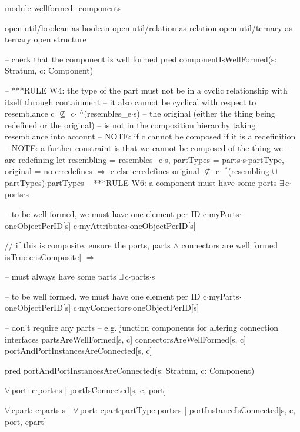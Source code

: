 module wellformed_components

open util/boolean as boolean
open util/relation as relation
open util/ternary as ternary
open structure


-- check that the component is well formed
pred componentIsWellFormed(s: Stratum, c: Component)
{
  -- ***RULE W4: the type of the part must not be in a cyclic relationship with itself through containment
  -- it also cannot be cyclical with respect to resemblance
  c $\not\subseteq$ c$\cdot$ $\!\!\!^\wedge\!$(resembles_e$\cdot$s)
  -- the original (either the thing being redefined or the original)
  -- is not in the composition hierarchy taking resemblance into account
  -- NOTE: if c cannot be composed if it is a redefinition
  -- NOTE: a further constraint is that we cannot be composed of the thing we
  --       are redefining
  let
    resembling = resembles_e$\cdot$s, partTypes = parts$\cdot$s$\cdot$partType,
    original = no c$\cdot$redefines $\Longrightarrow$ c else c$\cdot$redefines
  {
    original $\not\subseteq$ c$\cdot$ $\!\!\!^\ast\!$(resembling $\cup$ partTypes)$\cdot$partTypes
  }
  -- ***RULE W6: a component must have some ports
  $\exists\,$c$\cdot$ports$\cdot$s
  
  -- to be well formed, we must have one element per ID
  c$\cdot$myPorts$\cdot$oneObjectPerID[s]
  c$\cdot$myAttributes$\cdot$oneObjectPerID[s]
  
  // if this is composite, ensure the ports, parts $\wedge$ connectors are well formed
  isTrue[c$\cdot$isComposite] $\Longrightarrow$
  {
    -- must always have some parts
    $\exists\,$c$\cdot$parts$\cdot$s
  
    -- to be well formed, we must have one element per ID
    c$\cdot$myParts$\cdot$oneObjectPerID[s]
    c$\cdot$myConnectors$\cdot$oneObjectPerID[s]

    -- don't require any parts -- e.g. junction components for altering connection interfaces
    partsAreWellFormed[s, c]
    connectorsAreWellFormed[s, c]
    portAndPortInstancesAreConnected[s, c]
  }
}

pred portAndPortInstancesAreConnected(s: Stratum, c: Component)
{
  $\forall\,$port: c$\cdot$ports$\cdot$s |
    portIsConnected[s, c, port]
    
  $\forall\,$cpart: c$\cdot$parts$\cdot$s |
    $\forall\,$port: cpart$\cdot$partType$\cdot$ports$\cdot$s |
      portInstanceIsConnected[s, c, port, cpart]
}


